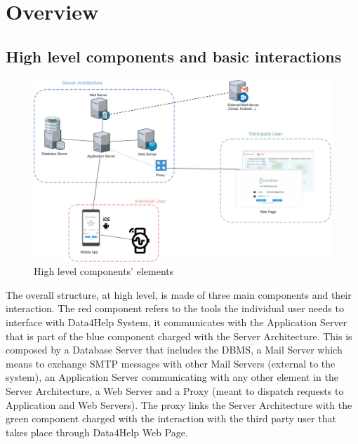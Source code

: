 \section{Overview}
\subsection{High level components and basic interactions}
\begin{figure}[H]
\caption{High level components' elements}
\includegraphics[width = \textwidth]{sections/architecturalDesign/overview_1.jpg}
\end{figure}

The overall structure, at high level, is made of three main components and their interaction. 
The red component refers to the tools the individual user needs to interface with Data4Help System, it communicates with the Application Server that is part of the blue component charged with the Server Architecture. This is composed by a Database Server that includes the DBMS, a Mail Server which means to exchange SMTP messages with other Mail Servers (external to the system), an Application Server communicating with any other element in the Server Architecture, a Web Server and a Proxy (meant to dispatch requests to Application and Web Servers). 
The proxy links the Server Architecture with the green component charged with the interaction with the third party user that takes place through Data4Help Web Page. 

